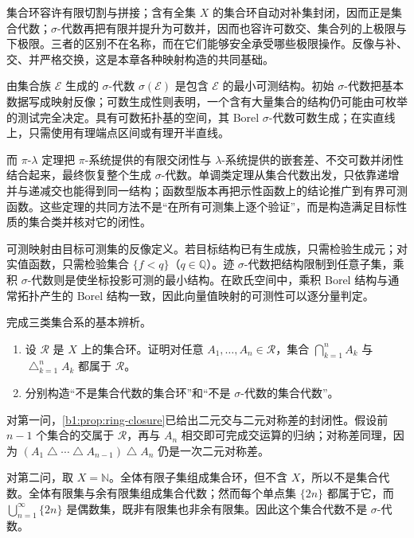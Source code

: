 




\begin{chaptersummary}
集合环容许有限切割与拼接；含有全集 \(X\) 的集合环自动对补集封闭，因而正是集合代数；\(\sigma\)-代数再把有限并提升为可数并，因而也容许可数交、集合列的上极限与下极限。三者的区别不在名称，而在它们能够安全承受哪些极限操作。反像与补、交、并严格交换，这是本章各种映射构造的共同基础。

\ProseParagraphBreak

由集合族 \(\mathcal E\) 生成的 \(\sigma\)-代数 \(\sigma(\mathcal E)\) 是包含 \(\mathcal E\) 的最小可测结构。初始 \(\sigma\)-代数把基本数据写成映射反像；可数生成性则表明，一个含有大量集合的结构仍可能由可枚举的测试完全决定。具有可数拓扑基的空间，其 Borel \(\sigma\)-代数可数生成；在实直线上，只需使用有理端点区间或有理开半直线。

\ProseParagraphBreak

而 \(\pi\)-\(\lambda\) 定理把 \(\pi\)-系统提供的有限交闭性与 \(\lambda\)-系统提供的嵌套差、不交可数并闭性结合起来，最终恢复整个生成 \(\sigma\)-代数。单调类定理从集合代数出发，只依靠递增并与递减交也能得到同一结构；函数型版本再把示性函数上的结论推广到有界可测函数。这些定理的共同方法不是“在所有可测集上逐个验证”，而是构造满足目标性质的集合类并核对它的闭性。

\ProseParagraphBreak

可测映射由目标可测集的反像定义。若目标结构已有生成族，只需检验生成元；对实值函数，只需检验集合 \(\{f<q\}\)（\(q\in\mathbb Q\)）。迹 \(\sigma\)-代数把结构限制到任意子集，乘积 \(\sigma\)-代数则是使坐标投影可测的最小结构。在欧氏空间中，乘积 Borel 结构与通常拓扑产生的 Borel 结构一致，因此向量值映射的可测性可以逐分量判定。
\end{chaptersummary}

\BookExercises

\begin{exercise}
\label{b1:ex:01}
完成三类集合系的基本辨析。
\begin{enumerate}
  \item \label{b1:item:ex01-1}
  设 \(\mathcal R\) 是 \(X\) 上的集合环。证明对任意 \(A_1,\ldots,A_n\in\mathcal R\)，集合 \(\bigcap_{k=1}^{n}A_k\) 与 \(\bigtriangleup_{k=1}^{n}A_k\) 都属于 \(\mathcal R\)。
  \item \label{b1:item:ex01-2}
  分别构造“不是集合代数的集合环”和“不是 \(\sigma\)-代数的集合代数”。
\end{enumerate}
\end{exercise}
\begin{solution}
对第一问，\cref{b1:prop:ring-closure}已给出二元交与二元对称差的封闭性。假设前 \(n-1\) 个集合的交属于 \(\mathcal R\)，再与 \(A_n\) 相交即可完成交运算的归纳；对称差同理，因为
\(
(A_1\mathbin{\triangle}\cdots\mathbin{\triangle} A_{n-1})\mathbin{\triangle} A_n
\)
仍是一次二元对称差。

对第二问，取 \(X=\mathbb N\)。全体有限子集组成集合环，但不含 \(X\)，所以不是集合代数。全体有限集与余有限集组成集合代数；然而每个单点集 \(\{2n\}\) 都属于它，而
\(
\bigcup_{n=1}^{\infty}\{2n\}
\)
是偶数集，既非有限集也非余有限集。因此这个集合代数不是 \(\sigma\)-代数。
\end{solution}

